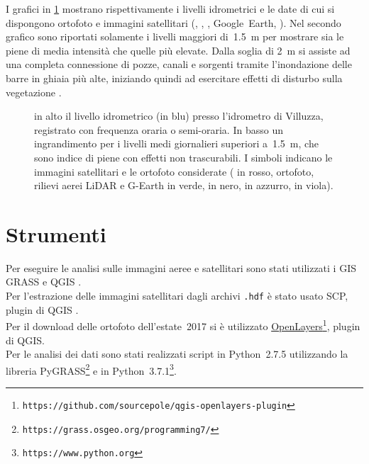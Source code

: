 I grafici in \cref{graph:livelli-orto-sat} mostrano rispettivamente i livelli idrometrici e le date di cui si dispongono ortofoto e immagini satellitari (\AST{}, \Pl{}, \Se{}, Google~Earth, \WV{}). 
Nel secondo grafico sono riportati solamente i livelli maggiori di~\SI{1.5}{\m} per mostrare sia le piene di media intensità che quelle più elevate.
Dalla soglia di \SI{2}{\m} si assiste ad una completa connessione di pozze, canali e sorgenti tramite l'inondazione delle barre in ghiaia più alte, iniziando quindi ad esercitare effetti di disturbo sulla vegetazione .
%
\begin{figure}
	\centering
	
	
	\caption[livelli idrometrici e foto aeree - satellitari]{in alto il livello idrometrico (in blu) presso l'idrometro di Villuzza, registrato con frequenza oraria o semi-oraria. 
	In basso un ingrandimento per i livelli medi giornalieri superiori a~\SI{1.5}{\m}, che sono indice di piene con effetti non trascurabili.
	I simboli indicano le immagini satellitari e le ortofoto considerate (\AST{} in rosso, ortofoto, rilievi aerei LiDAR e G-Earth in verde, \Pl{} in nero, \Se{} in azzurro, \WV{} in viola).}
	\label{graph:livelli-orto-sat}
\end{figure}



\section{Strumenti}
Per eseguire le analisi sulle immagini aeree e satellitari sono stati utilizzati i GIS GRASS  e QGIS . 
\\
Per l'estrazione delle immagini satellitari \AST{} dagli archivi \texttt{.hdf} è stato usato SCP, plugin di QGIS . 
\\
Per il download delle ortofoto dell'estate~2017 si è utilizzato \href{https://github.com/sourcepole/qgis-openlayers-plugin}{OpenLayers}\footnote{\texttt{https://github.com/sourcepole/qgis-openlayers-plugin}}, plugin di QGIS.
\\
Per le analisi dei dati sono stati realizzati script in Python~2.7.5 utilizzando la libreria PyGRASS\footnote{\texttt{https://grass.osgeo.org/programming7/}}  e in Python~3.7.1\footnote{\texttt{https://www.python.org}}.

